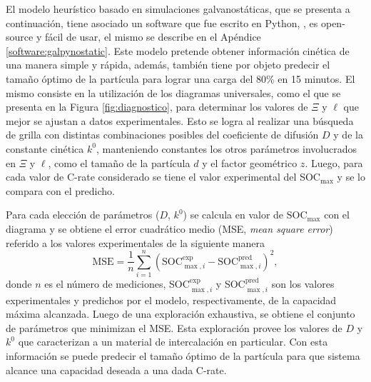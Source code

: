 El modelo heurístico basado en simulaciones galvanostáticas, que se presenta a 
continuación, tiene asociado un software que fue escrito en Python, 
, es open-source y fácil de usar, el mismo se describe en el
Apéndice \ref{software:galpynostatic}. Este modelo pretende obtener información
cinética de una manera simple y rápida, además, también tiene por objeto predecir el 
tamaño óptimo de la partícula para lograr una carga del 80\% en 15 minutos.
El mismo consiste en la utilización de los diagramas universales, como el que 
se presenta en la Figura \ref{fig:diagnostico}, para determinar los valores de
$\Xi$ y $\ell$ que mejor se ajustan a datos experimentales. Esto se logra al 
realizar una búsqueda de grilla con distintas combinaciones posibles del 
coeficiente de difusión $D$ y de la constante cinética $k^0$, manteniendo 
constantes los otros parámetros involucrados en $\Xi$ y $\ell$, como el tamaño 
de la partícula $d$ y el factor geométrico $z$. Luego, para cada valor de C-rate
considerado se tiene el valor experimental del SOC$_{\max}$ y se lo compara con 
el predicho.

Para cada elección de parámetros ($D$, $k^0$) se calcula en valor de 
$\text{SOC}_{\max}$ con el diagrama y se obtiene el error cuadrático medio (MSE,
\textit{mean square error}) referido a los valores experimentales de la siguiente
manera
\begin{equation}
    \text{MSE} = \frac{1}{n} \sum_{i=1}^n \left(\text{SOC}_{\max,i}^{\text{exp}} - \text{SOC}_{\max,i}^{\text{pred}}\right)^2,
\end{equation}
donde $n$ es el número de mediciones, SOC$_{\max, i}^{\exp}$ y 
SOC$_{\max, i}^{\text{pred}}$ son los valores experimentales y predichos por el 
modelo, respectivamente, de la capacidad máxima alcanzada. Luego de una 
exploración exhaustiva, se obtiene el conjunto de parámetros que minimizan el MSE. 
Esta exploración provee los valores de $D$ y $k^0$ que caracterizan a un material de 
intercalación en particular. Con esta información se puede predecir el tamaño 
óptimo de la partícula para que sistema alcance una capacidad deseada a una dada 
C-rate.
